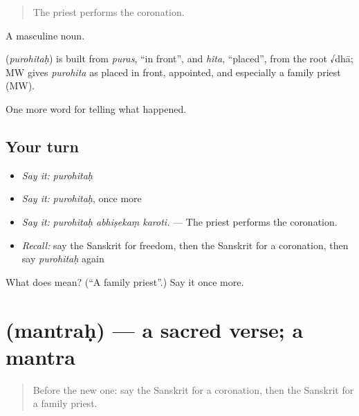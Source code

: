 \begin{quote}
The priest performs the coronation.
\end{quote}

A masculine noun.

\begin{cousinweb}
\textbf{} (\emph{purohitaḥ}) is built from \emph{puras}, \textquotedblleft{}in front\textquotedblright{}, and \emph{hita}, \textquotedblleft{}placed\textquotedblright{}, from the root √dhā; MW gives \emph{purohita} as placed in front, appointed, and especially a family priest (MW).
\end{cousinweb}

\begin{grammarlens}[title={What you've built}]
One more word for telling what happened.
\end{grammarlens}

\subsection*{Your turn}
\begin{itemize}
\raggedright
  \item \emph{Say it:} \emph{purohitaḥ}
  \item \emph{Say it:} \emph{purohitaḥ}, once more
  \item \emph{Say it:} \emph{purohitaḥ abhiṣekaṃ karoti.} — The priest performs the coronation.
  \item \emph{Recall:} say the Sanskrit for freedom, then the Sanskrit for a coronation, then say \emph{purohitaḥ} again
\end{itemize}

\begin{tcolorbox}[breakable,colback=teal!4,colframe=teal!35!black,title={Before you move on}]
What does  mean? (\textquotedblleft{}A family priest\textquotedblright{}.) Say it once more.
\end{tcolorbox}
\section[\texorpdfstring{\sk{मन्त्रः} (mantraḥ)}{मन्त्रः (mantraḥ)}]{ (mantraḥ) — a sacred verse; a mantra}

\label{lesson:SA-C321-mantrah}



\begin{quote}
Before the new one: say the Sanskrit for a coronation, then the Sanskrit for a family priest.
\end{quote}

